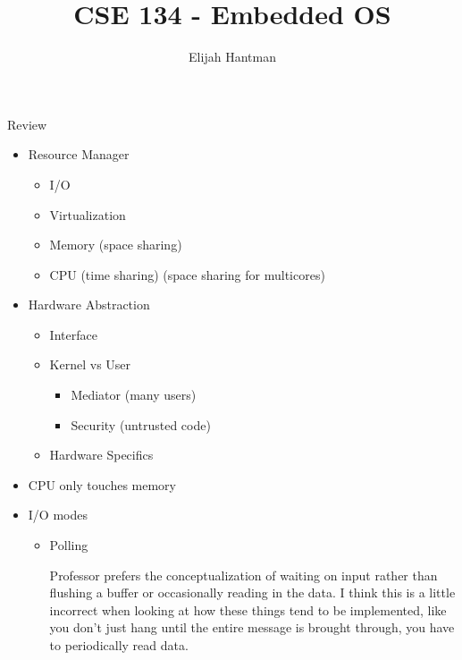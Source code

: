 \documentclass{report}
\title{\Huge{CSE 134 - Embedded OS}}
\author{\huge{Elijah Hantman}}
\date{}
\begin{document}
\maketitle
\newpage

\begin{description}
    \item Review 
        \begin{itemize}
            \item Resource Manager
                \begin{itemize}
                    \item I/O
                    \item Virtualization
                    \item Memory (space sharing)
                    \item CPU (time sharing) (space sharing for multicores)
                \end{itemize}
            \item Hardware Abstraction
                \begin{itemize}
                    \item Interface
                    \item Kernel vs User
                        \begin{itemize}
                            \item Mediator (many users)
                            \item Security (untrusted code)
                        \end{itemize}
                    \item Hardware Specifics
                \end{itemize}
            \item CPU only touches memory
            \item I/O modes
                \begin{itemize}
                    \item Polling
                        \begin{mdframed}
                            Professor prefers the conceptualization
                            of waiting on input rather than flushing a buffer
                            or occasionally reading in the data. I think this is
                            a little incorrect when looking at how these things
                            tend to be implemented, like you don't just hang until
                            the entire message is brought through, you have to periodically
                            read data.


\end{mdframed}
\end{itemize}
\end{itemize}
\end{description}
\end{document}
